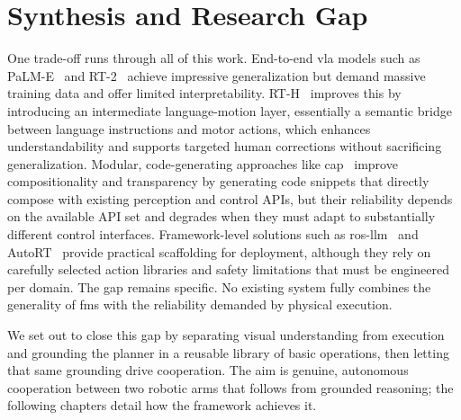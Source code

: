 \section{Synthesis and Research Gap}
One trade-off runs through all of this work. End-to-end \gls{vla} models such as PaLM-E~\cite{driess2023palmeembodiedmultimodallanguage} and RT-2~\cite{brohan2023rt2visionlanguageactionmodelstransfer} achieve impressive generalization but demand massive training data and offer limited interpretability. RT-H~\cite{belkhale2024rthactionhierarchiesusing} improves this by introducing an intermediate language-motion layer, essentially a semantic bridge between language instructions and motor actions, which enhances understandability and supports targeted human corrections without sacrificing generalization. Modular, code-generating approaches like \gls{cap}~\cite{liang2023codepolicieslanguagemodel} improve compositionality and transparency by generating code snippets that directly compose with existing perception and control APIs, but their reliability depends on the available API set and degrades when they must adapt to substantially different control interfaces. Framework-level solutions such as \gls{ros}-\gls{llm}~\cite{Mower_2026} and AutoRT~\cite{ahn2024autortembodiedfoundationmodels} provide practical scaffolding for deployment, although they rely on carefully selected action libraries and safety limitations that must be engineered per domain. The gap remains specific. No existing system fully combines the generality of \glspl{fm} with the reliability demanded by physical execution.

We set out to close this gap by separating visual understanding from execution and grounding the planner in a reusable library of basic operations, then letting that same grounding drive cooperation. The aim is genuine, autonomous cooperation between two robotic arms that follows from grounded reasoning; the following chapters detail how the framework achieves it.

